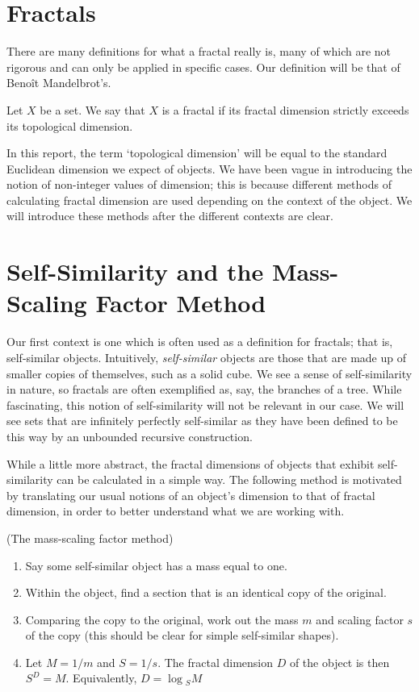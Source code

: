 \section{Fractals}
There are many definitions for what a fractal really is, many of which are not rigorous and can only be applied in specific cases. Our definition will be that of Benoît Mandelbrot's.
\begin{defn}
    Let $X$ be a set. We say that $X$ is a fractal if its fractal dimension strictly exceeds its topological dimension. \cite{mandelbrot1983fractal}
\end{defn}
In this report, the term `topological dimension' will be equal to the standard Euclidean dimension we expect of objects. We have been vague in introducing the notion of non-integer values of dimension; this is because different methods of calculating fractal dimension are used depending on the context of the object. We will introduce these methods after the different contexts are clear.

\section{Self-Similarity and the Mass-Scaling Factor Method}
Our first context is one which is often used as a definition for fractals; that is, self-similar objects. Intuitively, \emph{self-similar} objects are those that are made up of smaller copies of themselves, such as a solid cube. We see a sense of self-similarity in nature, so fractals are often exemplified as, say, the branches of a tree. While fascinating, this notion of self-similarity will not be relevant in our case. We will see sets that are infinitely perfectly self-similar as they have been defined to be this way by an unbounded recursive construction.

While a little more abstract, the fractal dimensions of objects that exhibit self-similarity can be calculated in a simple way. The following method is motivated by translating our usual notions of an object's dimension to that of fractal dimension, in order to better understand what we are working with. 

\begin{prop} \label{MSF}
    (The mass-scaling factor method)
    \begin{enumerate}
        \item Say some self-similar object has a mass equal to one.
        \item Within the object, find a section that is an identical copy of the original.
        \item Comparing the copy to the original, work out the mass $m$ and scaling factor $s$ of the copy (this should be clear for simple self-similar shapes).
        \item Let $M=1/m$ and $S=1/s$. The fractal dimension $D$ of the object is then $S^D=M.$ Equivalently, $D=\log{_SM}$
    \end{enumerate}
\end{prop}

